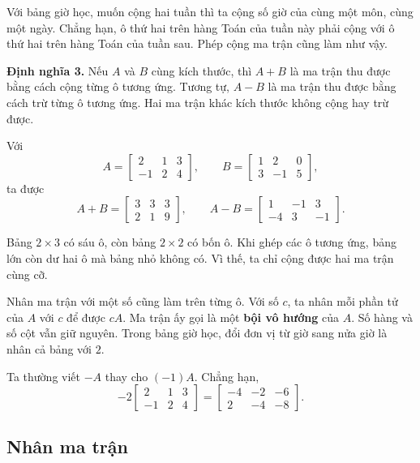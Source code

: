 \documentclass[12pt,a4paper]{article}
\begin{document}
Với bảng giờ học, muốn cộng hai tuần thì ta cộng số giờ của cùng một môn, cùng một ngày. Chẳng hạn, ô thứ hai trên hàng Toán của tuần này phải cộng với ô thứ hai trên hàng Toán của tuần sau. Phép cộng ma trận cũng làm như vậy.

\textbf{Định nghĩa 3.} Nếu \(A\) và \(B\) cùng kích thước, thì \(A+B\) là ma trận thu được bằng cách cộng từng ô tương ứng. Tương tự, \(A-B\) là ma trận thu được bằng cách trừ từng ô tương ứng. Hai ma trận khác kích thước không cộng hay trừ được.

Với
$$
A=\left[ \begin{array}{rrr} 2 & 1 & 3\\ -1 & 2 & 4 \end{array} \right],\qquad
B=\left[ \begin{array}{rrr} 1 & 2 & 0\\ 3 & -1 & 5 \end{array} \right],
$$
ta được
$$
A+B=\left[ \begin{array}{rrr} 3 & 3 & 3\\ 2 & 1 & 9 \end{array} \right],\qquad
A-B=\left[ \begin{array}{rrr} 1 & -1 & 3\\ -4 & 3 & -1 \end{array} \right].
$$

Bảng \(2\times3\) có sáu ô, còn bảng \(2\times2\) có bốn ô. Khi ghép các ô tương ứng, bảng lớn còn dư hai ô mà bảng nhỏ không có. Vì thế, ta chỉ cộng được hai ma trận cùng cỡ.

Nhân ma trận với một số cũng làm trên từng ô. Với số \(c\), ta nhân mỗi phần tử của \(A\) với \(c\) để được \(cA\). Ma trận ấy gọi là một \textbf{bội vô hướng} của \(A\). Số hàng và số cột vẫn giữ nguyên. Trong bảng giờ học, đổi đơn vị từ giờ sang nửa giờ là nhân cả bảng với \(2\).

Ta thường viết \(-A\) thay cho \((-1)A\). Chẳng hạn,
$$
-2\left[ \begin{array}{rrr} 2 & 1 & 3\\ -1 & 2 & 4 \end{array} \right]
=
\left[ \begin{array}{rrr} -4 & -2 & -6\\ 2 & -4 & -8 \end{array} \right].
$$

\subsection{Nhân ma trận}
\end{document}
